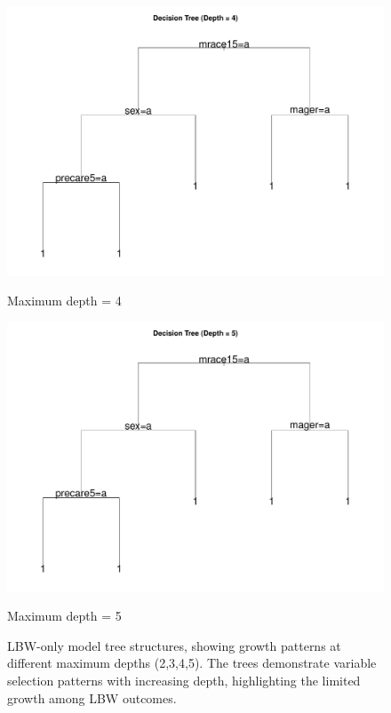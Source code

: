 \begin{figure}[p]
    \vspace{1cm}
    
    \begin{minipage}{0.48\textwidth}
        \centering
        \includegraphics[width=\linewidth]{chapters/chapter3/figures/depth/plot2/decision_tree_depth_4_2021_large.pdf}
        \caption*{Maximum depth = 4}
    \end{minipage}
    \hspace{0.02\textwidth}
    \begin{minipage}{0.48\textwidth}
        \centering
        \includegraphics[width=\linewidth]{chapters/chapter3/figures/depth/plot2/decision_tree_depth_5_2021_large.pdf}
        \caption*{Maximum depth = 5}
    \end{minipage}
    \caption{LBW-only model tree structures, showing growth patterns at different maximum depths (2,3,4,5). The trees demonstrate variable selection patterns with increasing depth, highlighting the limited growth among LBW outcomes.}
    \label{fig:trees-comparison-lbw}
\end{figure}

